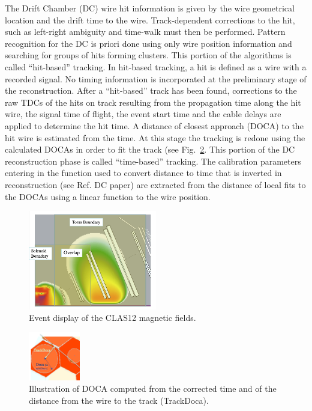 The Drift Chamber (DC) wire hit information is given by the wire geometrical location and the drift time
to the wire. Track-dependent corrections to the hit, such as left-right ambiguity and time-walk must then
be performed. 
Pattern recognition for the DC is priori done using only wire position information and searching for groups of hits forming clusters.  This portion of the algorithms is called ``hit-based'' tracking.  In hit-based
tracking, a hit is defined as a wire with a recorded signal.  No timing information is incorporated at the
preliminary stage of the reconstruction.  
After a ``hit-based''  track has been found, corrections to the raw TDCs of the hits on track resulting from the propagation time along the hit wire, the signal time of flight, the event start time and the cable delays are applied to determine the hit time.  A distance of closest approach (DOCA) to the hit wire is estimated from the time.  At this stage the tracking is redone using the calculated DOCAs in order to fit the track (see Fig.~\ref{fig:docas}.  This portion of the DC reconstruction phase is called ``time-based'' tracking.  The calibration parameters entering in the function used to convert distance to time that is inverted in reconstruction (see Ref. DC paper) are extracted from the distance of local fits to the DOCAs using a linear function to the wire position. 


\begin{figure}
\centering
\includegraphics[width=0.5\textwidth]{pics/Bfields.png}
\caption{Event display of the CLAS12 magnetic fields. 
}
\label{fig:fields}
\end{figure}
\begin{figure}
\centering
\includegraphics[width=0.2\textwidth]{pics/dcPattern10.png}
\caption{
Illustration of DOCA computed from the corrected time and of the distance from the wire to the track (TrackDoca).
}
\label{fig:docas}
\end{figure}

